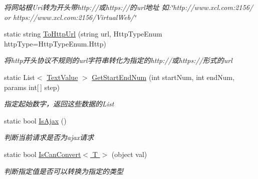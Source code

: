 \begin{DoxyCompactItemize}
\begin{DoxyCompactList}\small\item\em 将网站根\+Uri转为开头带http\+://或https\+://的url地址 如\+:\char`\"{}http\+://www.\+xcl.\+com\+:2156/ or https\+://www.\+xcl.\+com\+:2156/\+Virtual\+Web/\char`\"{} \end{DoxyCompactList}\item 
static string \hyperlink{class_x_c_l_net_tools_1_1_string_hander_1_1_common_ae66c8e05d6326deb1b9c669df9e4e4de}{To\+Http\+Url} (string url, Http\+Type\+Enum http\+Type=Http\+Type\+Enum.\+Http)
\begin{DoxyCompactList}\small\item\em 将http开头协议不规则的url字符串转化为指定的http\+://或https\+://形式的url \end{DoxyCompactList}\item 
static List$<$ \hyperlink{class_x_c_l_net_tools_1_1_entity_1_1_text_value}{Text\+Value} $>$ \hyperlink{class_x_c_l_net_tools_1_1_string_hander_1_1_common_a34f200ef899d3b8ff3bff707f86c24d2}{Get\+Start\+End\+Num} (int start\+Num, int end\+Num, params int\mbox{[}$\,$\mbox{]} step)
\begin{DoxyCompactList}\small\item\em 指定起始数字，返回这些数据的\+List \end{DoxyCompactList}\item 
static bool \hyperlink{class_x_c_l_net_tools_1_1_string_hander_1_1_common_a2573b0ab4c60ce76ab6713ed40339db4}{Is\+Ajax} ()
\begin{DoxyCompactList}\small\item\em 判断当前请求是否为ajax请求 \end{DoxyCompactList}\item 
static bool \hyperlink{class_x_c_l_net_tools_1_1_string_hander_1_1_common_a9e27b7aee03f20572b1d66d1df37dbbc}{Is\+Can\+Convert$<$ T $>$} (object val)
\begin{DoxyCompactList}\small\item\em 判断指定值是否可以转换为指定的类型 \end{DoxyCompactList}\end{DoxyCompactItemize}
